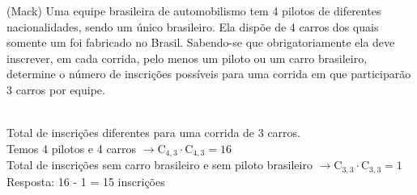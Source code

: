\begin{ex}
(Mack) Uma equipe brasileira de automobilismo tem 4 pilotos de diferentes nacionalidades, sendo um único brasileiro. Ela dispõe de 4 carros dos quais somente um foi fabricado no Brasil. Sabendo-se que obrigatoriamente ela deve inscrever, em cada corrida, pelo menos um piloto ou um carro brasileiro, determine o número de inscrições possíveis para uma corrida em que participarão 3 carros por equipe.
  \begin{sol}
   \phantom{A} \\
   Total de inscrições diferentes para uma corrida de 3 carros.\\
   Temos 4 pilotos e 4 carros $\rightarrow \mathrm{C}_{4,3}\cdot\mathrm{C}_{4,3}=16$ \\
   Total de inscrições sem carro  brasileiro e sem piloto brasileiro $\rightarrow \mathrm{C}_{3,3}\cdot\mathrm{C}_{3,3}=1$ \\
   Resposta: 16 - 1 = 15 inscrições
   
  \end{sol}
\end{ex}